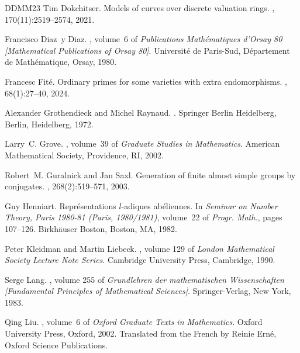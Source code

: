 \documentclass[11pt,a4paper]{article}
\begin{document}
\begin{thebibliography}{DDMM23}
Tim Dokchitser.
\newblock Models of curves over discrete valuation rings.
, 170(11):2519--2574, 2021.

Francisco Diaz~y Diaz.
, volume~6 of {\em Publications Math\'{e}matiques d'Orsay 80 [Mathematical Publications of Orsay 80]}.
\newblock Universit\'{e} de Paris-Sud, D\'{e}partement de Math\'{e}matique, Orsay, 1980.

Francesc Fit\'e.
\newblock Ordinary primes for some varieties with extra endomorphisms.
, 68(1):27--40, 2024.

Alexander Grothendieck and Michel Raynaud.
.
\newblock Springer Berlin Heidelberg, Berlin, Heidelberg, 1972.

Larry~C. Grove.
, volume~39 of {\em Graduate Studies in Mathematics}.
\newblock American Mathematical Society, Providence, RI, 2002.

Robert~M. Guralnick and Jan Saxl.
\newblock Generation of finite almost simple groups by conjugates.
, 268(2):519--571, 2003.

Guy Henniart.
\newblock Repr\'{e}sentations {$l$}-adiques ab\'{e}liennes.
\newblock In {\em Seminar on {N}umber {T}heory, {P}aris 1980-81 ({P}aris, 1980/1981)}, volume~22 of {\em Progr. Math.}, pages 107--126. Birkh\"{a}user Boston, Boston, MA, 1982.

Peter Kleidman and Martin Liebeck.
, volume 129 of {\em London Mathematical Society Lecture Note Series}.
\newblock Cambridge University Press, Cambridge, 1990.

Serge Lang.
, volume 255 of {\em Grundlehren der mathematischen Wissenschaften [Fundamental Principles of Mathematical Sciences]}.
\newblock Springer-Verlag, New York, 1983.

Qing Liu.
, volume~6 of {\em Oxford Graduate Texts in Mathematics}.
\newblock Oxford University Press, Oxford, 2002.
\newblock Translated from the French by Reinie Ern\'e, Oxford Science Publications.


\end{thebibliography}
\end{document}
